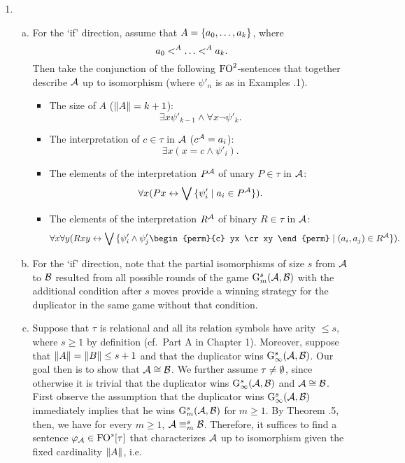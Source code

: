 \begin{enumerate}[1.]
%
\item {}
\begin{enumerate}[(a)]
\item For the `if' direction, assume that $A = {\{a_0, \ldots, a_k\}}$, where
\[
a_0 \mathrel{<^{A}} \ldots \mathrel{<^{A}} a_k.
\]
Then take the conjunction of the following $\folog[2]$-sentences that together describe $\mathcal{A}$ up to isomorphism (where $\psi'_n$ is as in Examples \thesection.1).
\begin{itemize}
\item The size of $A$ ($\|A\| = k + 1$):
\[
\exists x \psi'_{k - 1} \land \forall x \neg\psi'_k.
\]
\item The interpretation of $c \in \tau$ in $\mathcal{A}$ ($c^{\mathcal{A}} = a_i$):
\[
\exists x (x = c \land \psi'_i).
\]
\item The elements of the interpretation $P^{\mathcal{A}}$ of unary $P \in \tau$ in $\mathcal{A}$:
\[
\forall x (Px \leftrightarrow \bigvee {\{\psi'_i \mid a_i \in P^{\mathcal{A}}\}}).
\]
\item The elements of the interpretation $R^{\mathcal{A}}$ of binary $R \in \tau$ in $\mathcal{A}$:
\[
\forall x \forall y (Rxy \liff \blor \setm{\psi'_i \land \psi'_j\begin{perm}{c} yx \cr xy \end{perm}}{(a_i, a_j) \in \intpr{R}{\strct{A}}}).
\]
\end{itemize}
\item For the `if' direction, note that the partial isomorphisms of size $s$ from $\mathcal{A}$ to $\mathcal{B}$ resulted from all possible rounds of the game $\game[s]{m}(\strct{A}, \strct{B})$ with the additional condition after $s$ moves provide a winning strategy for the duplicator in the same game without that condition.
\item Suppose that $\tau$ is relational and all its relation symbols have arity $\leq s$, where $s \geq 1$ by definition (cf.\ Part A in Chapter 1). Moreover, suppose that $\|A\| = \|B\| \leq s + 1$ and that the duplicator wins $\game[s]{\infty}(\strct{A}, \strct{B})$. Our goal then is to show that $\strct{A} \isom \strct{B}$. We further assume $\tau \neq \emptyset$, since otherwise it is trivial that the duplicator wins $\game[s]{\infty}(\strct{A}, \strct{B})$ and $\strct{A} \isom \strct{B}$.
\medskip\\
First observe the assumption that the duplicator wins $\game[s]{\infty}(\strct{A}, \strct{B})$ immediately implies that he wins $\game[s]{m}(\strct{A}, \strct{B})$ for $m \geq 1$. By Theorem \thesection.5, then, we have for every $m \geq 1$, $\strct{A} \equv[s]_m \strct{B}$. Therefore, it suffices to find a sentence $\varphi_\strct{A} \in \folog[s]\of{\tau}$ that characterizes $\mathcal{A}$ up to isomorphism given the fixed cardinality $\|A\|$, i.e.

\end{enumerate}
\end{enumerate}
